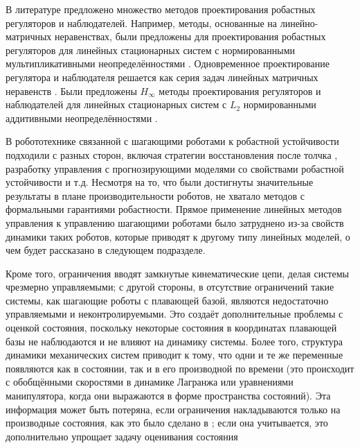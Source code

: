 В литературе предложено множество методов проектирования робастных регуляторов и наблюдателей. Например, методы, основанные на линейно-матричных неравенствах, были предложены для проектирования робастных регуляторов для линейных стационарных систем с нормированными мультипликативными неопределённостями \cite{POLYAK2021,ROTONDO2014}.
Одновременное проектирование регулятора и наблюдателя решается как серия задач линейных матричных неравенств \cite{ZEMOUCHE2015,GRITLI2021}. Были предложены $H_\infty$ методы проектирования регуляторов и наблюдателей для линейных стационарных систем с $L_2$ нормированными аддитивными неопределённостями \cite{Bennani2019, KHELOUFI2016}.

В робототехнике связанной с шагающими роботами к робастной устойчивости подходили с разных сторон, включая стратегии восстановления после толчка \cite{Pratt2006}, разработку управления с прогнозирующими моделями со свойствами робастной устойчивости \cite{KIM2019} и т.д. Несмотря на то, что были достигнуты значительные результаты в плане производительности роботов, не хватало методов с формальными гарантиями робастности. Прямое применение линейных методов управления к управлению шагающими роботами было затруднено из-за свойств динамики таких роботов, которые приводят к другому типу линейных моделей, о чем будет рассказано в следующем подразделе.

Кроме того, ограничения вводят замкнутые кинематические цепи, делая системы чрезмерно управляемыми; с другой стороны, в отсутствие ограничений такие системы, как шагающие роботы с плавающей базой, являются недостаточно управляемыми и неконтролируемыми. Это создаёт дополнительные проблемы с оценкой состояния, поскольку некоторые состояния в координатах плавающей базы не наблюдаются и не влияют на динамику системы. Более того, структура динамики механических систем приводит к тому, что одни и те же переменные появляются как в состоянии, так и в его производной по времени (это происходит с обобщёнными скоростями в динамике Лагранжа или уравнениями манипулятора, когда они выражаются в форме пространства состояний). Эта информация может быть потеряна, если ограничения накладываются только на производные состояния, как это было сделано в \cite{Mason2017}; если она учитывается, это дополнительно упрощает задачу оценивания состояния

